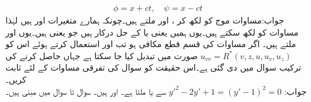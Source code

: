 \begin{align*}
\phi=x+ct,\quad \psi=x-ct
\end{align*}
جواب:\quad مساوات موج کو  لکھ کر ،  اور  ملتے ہیں۔چونکہ ہمارے متغیرات  اور  ہیں لہٰذا  مساوات  کو  لکھ سکتے ہیں۔یوں ہمیں  یعنی  یا  کے حل درکار ہیں جو  یعنی  ہیں۔یوں  اور  ملتے ہیں۔
\quad
اگر مساوات  کی قسم قطع مکافی ہو تب   اور  استعمال کرتے ہوئے اس کو
$u_{vv}=R^*(v,z,u,u_v,u_z)$
صورت میں تبدیل کیا جا سکتا ہے جہاں  حاصل کرنے کی ترکیب سوال  میں دی گئی ہے۔اس حقیقت کو سوال  کی تفرقی مساوات کے لئے ثابت کریں۔\\
جواب:\quad
$y'^2-2y'+1=(y'-1)^2=0$
سے  یا  ملتا ہے۔  اور  ہیں۔ 
سوال  تا سوال   میں مبنی ہیں۔

